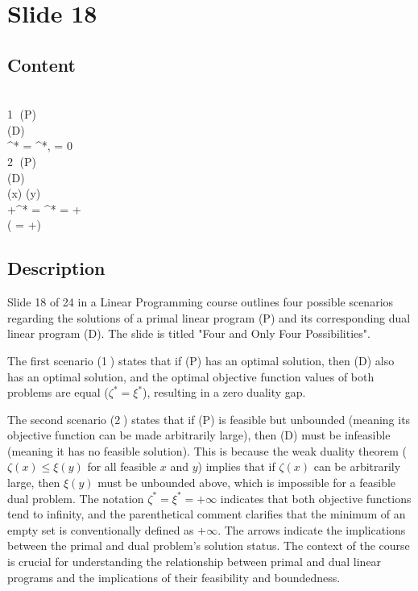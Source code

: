\documentclass{article}%
\begin{document}
%
\newpage%
\section{Slide 18}%
\label{sec:Slide18}%
\subsection{Content}%

 \\
\textcircled{1} \quad (P)  \\
\implies (D)  \\
\zeta^* = \xi^*, \quad {} = 0 \\
\textcircled{2} \quad (P)  \\
\implies (D)  \\
\zeta(x) \le \xi(y) \\
\rightarrow +\infty \quad \zeta^* = \xi^* = +\infty \\
( = +\infty)
%
\subsection{Description}%
Slide 18 of 24 in a Linear Programming course outlines four possible scenarios regarding the solutions of a primal linear program (P) and its corresponding dual linear program (D).  The slide is titled "Four and Only Four Possibilities".

The first scenario (\textcircled{1}) states that if (P) has an optimal solution, then (D) also has an optimal solution, and the optimal objective function values of both problems are equal ($\zeta^* = \xi^*$), resulting in a zero duality gap.

The second scenario (\textcircled{2}) states that if (P) is feasible but unbounded (meaning its objective function can be made arbitrarily large), then (D) must be infeasible (meaning it has no feasible solution).  This is because the weak duality theorem ($\zeta(x) \le \xi(y)$ for all feasible $x$ and $y$) implies that if $\zeta(x)$ can be arbitrarily large, then $\xi(y)$ must be unbounded above, which is impossible for a feasible dual problem.  The notation $\zeta^* = \xi^* = +\infty$ indicates that both objective functions tend to infinity, and the parenthetical comment clarifies that the minimum of an empty set is conventionally defined as $+\infty$.  The arrows indicate the implications between the primal and dual problem's solution status. The context of the course is crucial for understanding the relationship between primal and dual linear programs and the implications of their feasibility and boundedness.%
\end{document}

